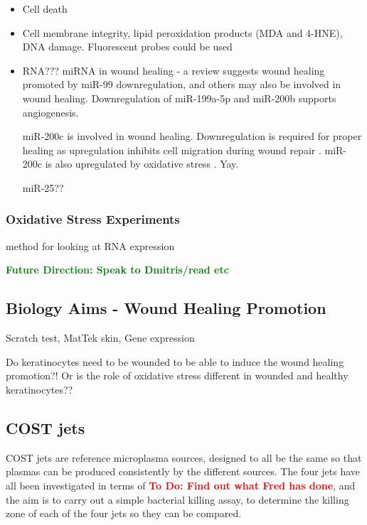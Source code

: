\documentclass[11pt, oneside]{article}   	%
\newcommand{\todo}[1]{ \textcolor{red}{\bf{To Do:} #1}}
\newcommand{\future}[1]{ \textcolor{green}{\bf{Future Direction: #1}}}
\begin{document}
\begin{itemize}
\item Cell death
\item Cell membrane integrity, lipid peroxidation products (MDA and 4-HNE), DNA damage. Fluorescent probes could be used \cite{Ayala2014lipid, Joshi2011nonthermal, Joshi2010control}
\item RNA???
miRNA in wound healing \cite{Riemondy2014not} - a review suggests wound healing promoted by miR-99 downregulation, and others may also be involved in wound healing. Downregulation of miR-199a-5p and miR-200b supports angiogenesis.

miR-200c is involved in wound healing. Downregulation is required for proper healing as upregulation inhibits cell migration during wound repair  \cite{Aunin2017exploring}. 
miR-200c is also upregulated by oxidative stress \cite{Magenta2011miR}. Yay.

miR-25??
\end{itemize}

\subsubsection{Oxidative Stress Experiments}
method for looking at RNA expression

\future{Speak to Dmitris/read etc}

\subsection{Biology Aims - Wound Healing Promotion}

Scratch test, MatTek skin, Gene expression

Do keratinocytes need to be wounded to be able to induce the wound healing promotion?! Or is the role of oxidative stress different in wounded and healthy keratinocytes??

\subsection{COST jets}

COST jets are reference microplasma sources, designed to all be the same so that plasmas can be produced consistently by the different sources.
The four jets have all been investigated in terms of \todo{Find out what Fred has done}, and the aim is to carry out a simple bacterial killing assay, to determine the killing zone of each of the four jets so they can be compared. 
\end{document}
